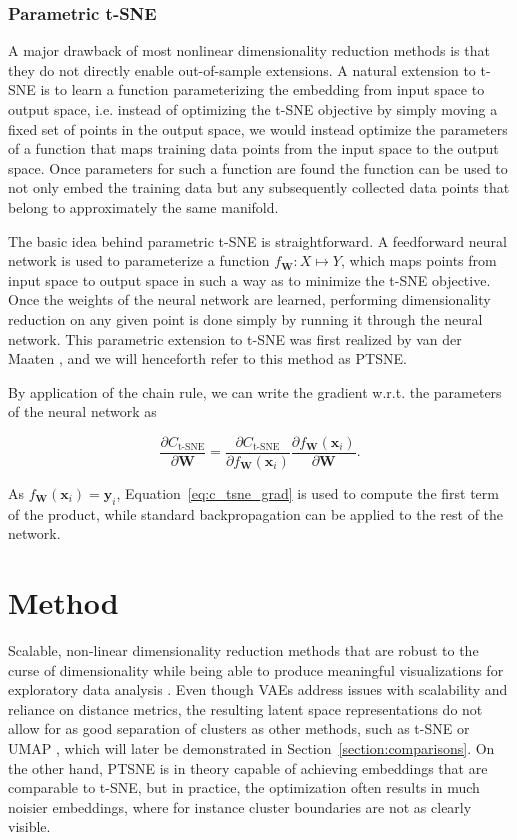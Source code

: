 \subsection{Parametric t-SNE}
\label{subsection:parametric_tsne}

A major drawback of most nonlinear dimensionality reduction methods is that they do not directly enable out-of-sample extensions. A natural extension to t-SNE is to learn a function parameterizing the embedding from input space to output space, i.e. instead of optimizing the t-SNE objective by simply moving a fixed set of points in the output space, we would instead optimize the parameters of a function that maps training data points from the input space to the output space. Once parameters for such a function are found the function can be used to not only embed the training data but any subsequently collected data points that belong to approximately the same manifold.

The basic idea behind parametric t-SNE is straightforward. A feedforward neural network is used to parameterize a function $f_\mathbf{W}: X \mapsto Y$, which maps points from input space to output space in such a way as to minimize the t-SNE objective. Once the weights of the neural network are learned, performing dimensionality reduction on any given point is done simply by running it through the neural network. This parametric extension to t-SNE was first realized by van der Maaten \cite{parametric_tsne}, and we will henceforth refer to this method as PTSNE.

By application of the chain rule, we can write the gradient w.r.t. the parameters of the neural network as

$$\frac{\partial C_{\text{t-SNE}}}{\partial \mathbf{W}} = \frac{\partial C_{\text{t-SNE}}}{\partial f_{\mathbf{W}}(\mathbf{x}_i)} \frac{\partial f_{\mathbf{W}}(\mathbf{x}_i)}{\partial \mathbf{W}}.$$

As $f_{\mathbf{W}}(\mathbf{x}_i) = \mathbf{y}_i$, Equation~\ref{eq:c_tsne_grad} is used to compute the first term of the product, while standard backpropagation can be applied to the rest of the network.

\chapter{Method}
\label{ch:method}

Scalable, non-linear dimensionality reduction methods that are robust to the curse of dimensionality while being able to produce meaningful visualizations for exploratory data analysis . Even though VAEs address issues with scalability and reliance on distance metrics, the resulting latent space representations do not allow for as good separation of clusters as other methods, such as t-SNE or UMAP \cite{umap}, which will later be demonstrated in Section~\ref{section:comparisons}. On the other hand, PTSNE is in theory capable of achieving embeddings that are comparable to t-SNE, but in practice, the optimization often results in much noisier embeddings, where for instance cluster boundaries are not as clearly visible.

